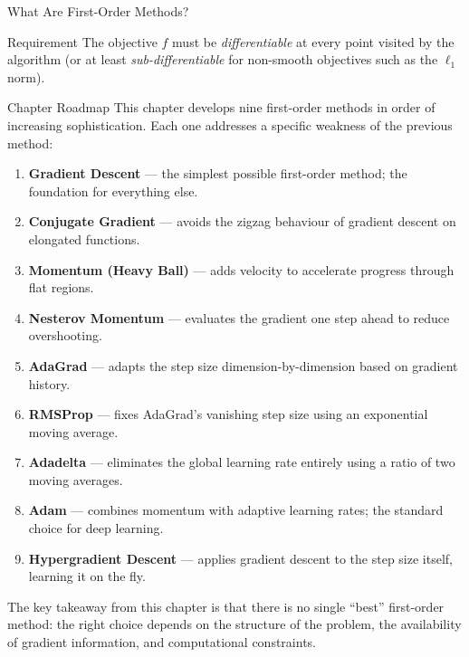 \documentclass[aspectratio=169,10pt]{beamer}
\begin{document}
\begin{frame}[allowframebreaks]{What Are First-Order Methods?}
  \vspace{0.5em}
  \begin{alertblock}{Requirement}
    The objective $f$ must be \emph{differentiable} at every point
    visited by the algorithm (or at least \emph{sub-differentiable}
    for non-smooth objectives such as the $\ell_1$ norm).
  \end{alertblock}

  \framebreak

  \begin{block}{Chapter Roadmap}
    This chapter develops nine first-order methods in order of
    increasing sophistication.  Each one addresses a specific
    weakness of the previous method:
    \begin{enumerate}
      \item \textbf{Gradient Descent} --- the simplest possible
            first-order method; the foundation for everything else.
      \item \textbf{Conjugate Gradient} --- avoids the zigzag
            behaviour of gradient descent on elongated functions.
      \item \textbf{Momentum (Heavy Ball)} --- adds velocity to
            accelerate progress through flat regions.
      \item \textbf{Nesterov Momentum} --- evaluates the gradient
            one step ahead to reduce overshooting.
      \item \textbf{AdaGrad} --- adapts the step size
            dimension-by-dimension based on gradient history.
      \item \textbf{RMSProp} --- fixes AdaGrad's vanishing step
            size using an exponential moving average.
      \item \textbf{Adadelta} --- eliminates the global learning
            rate entirely using a ratio of two moving averages.
      \item \textbf{Adam} --- combines momentum with adaptive
            learning rates; the standard choice for deep learning.
      \item \textbf{Hypergradient Descent} --- applies gradient
            descent to the step size itself, learning it on the fly.
    \end{enumerate}
  \end{block}

  The key takeaway from this chapter is that there is no single
  ``best'' first-order method: the right choice depends on the
  structure of the problem, the availability of gradient information,
  and computational constraints.

\end{frame}
\end{document}
